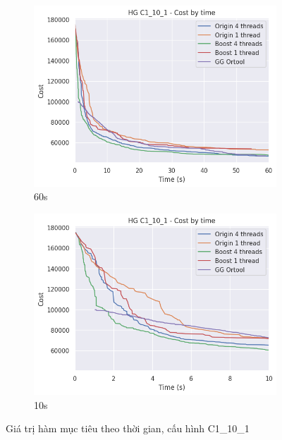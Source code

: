\begin{figure}[H] %
  \label{fig:perf_ct_c1_10}
  \begin{subfigure}{.5\textwidth}
    \centering
    \includegraphics[width=1\linewidth]{figures/cost_time_60s_C1_10_1.png}
    \caption{60s}
    \label{fig:perf_ct_c1_10_60s}
  \end{subfigure}%
  \begin{subfigure}{.5\textwidth}
    \centering
    \includegraphics[width=1\linewidth]{figures/cost_time_10s_C1_10_1.png}
    \caption{10s}
    \label{fig:perf_ct_c1_10_10s}
  \end{subfigure}
  \caption{Giá trị hàm mục tiêu theo thời gian, cấu hình C1\_10\_1}
\end{figure}


